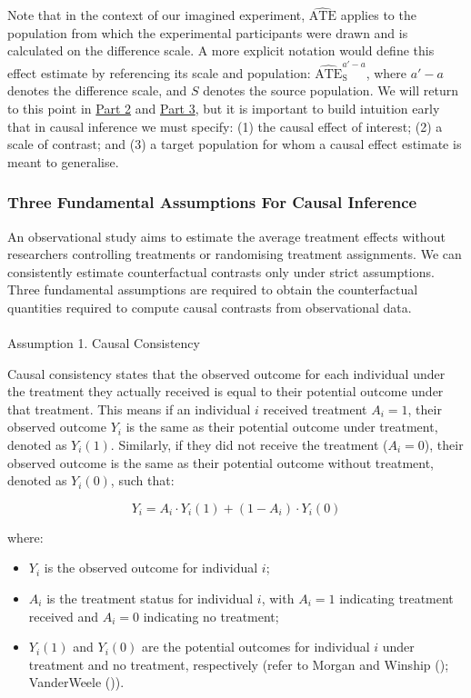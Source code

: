 \documentclass[
  single column]{article}
\makeatletter
\let\oldparagraph\paragraph
\renewcommand{\paragraph}{
    \@ifstar
      \xxxParagraphStar
      \xxxParagraphNoStar
  }
\newcommand{\xxxParagraphStar}[1]{\oldparagraph*{#1}\mbox{}}
\newcommand{\xxxParagraphNoStar}[1]{\oldparagraph{#1}\mbox{}}
\providecommand{\tightlist}{%
  \setlength{\itemsep}{0pt}\setlength{\parskip}{0pt}}\usepackage{longtable,booktabs,array}
\makeatother
\begin{document}
Note that in the context of our imagined experiment,
\(\widehat{\text{ATE}}\) applies to the population from which the
experimental participants were drawn and is calculated on the difference
scale. A more explicit notation would define this effect estimate by
referencing its scale and population:
\(\widehat{\text{ATE}}^{a'-a}_{\text{S}}\), where \(a'-a\) denotes the
difference scale, and \(S\) denotes the source population. We will
return to this point in \hyperref[id-sec-2]{Part 2} and
\hyperref[id-sec-3]{Part 3}, but it is important to build intuition
early that in causal inference we must specify: (1) the causal effect of
interest; (2) a scale of contrast; and (3) a target population for whom
a causal effect estimate is meant to generalise.

\subsubsection{Three Fundamental Assumptions For Causal
Inference}\label{three-fundamental-assumptions-for-causal-inference}

An observational study aims to estimate the average treatment effects
without researchers controlling treatments or randomising treatment
assignments. We can consistently estimate counterfactual contrasts only
under strict assumptions. Three fundamental assumptions are required to
obtain the counterfactual quantities required to compute causal
contrasts from observational data.

\paragraph{Assumption 1. Causal
Consistency}\label{assumption-1.-causal-consistency}

Causal consistency states that the observed outcome for each individual
under the treatment they actually received is equal to their potential
outcome under that treatment. This means if an individual \(i\) received
treatment \(A_i = 1\), their observed outcome \(Y_i\) is the same as
their potential outcome under treatment, denoted as \(Y_i(1)\).
Similarly, if they did not receive the treatment (\(A_i = 0\)), their
observed outcome is the same as their potential outcome without
treatment, denoted as \(Y_i(0)\), such that:

\[
Y_i = A_i \cdot Y_i(1) + (1 - A_i) \cdot Y_i(0)
\]

where:

\begin{itemize}
\tightlist
\item
  \(Y_i\) is the observed outcome for individual \(i\);
\item
  \(A_i\) is the treatment status for individual \(i\), with \(A_i = 1\)
  indicating treatment received and \(A_i = 0\) indicating no treatment;
\item
  \(Y_i(1)\) and \(Y_i(0)\) are the potential outcomes for individual
  \(i\) under treatment and no treatment, respectively (refer to Morgan
  and Winship (); VanderWeele
  ()).
\end{itemize}
\end{document}
